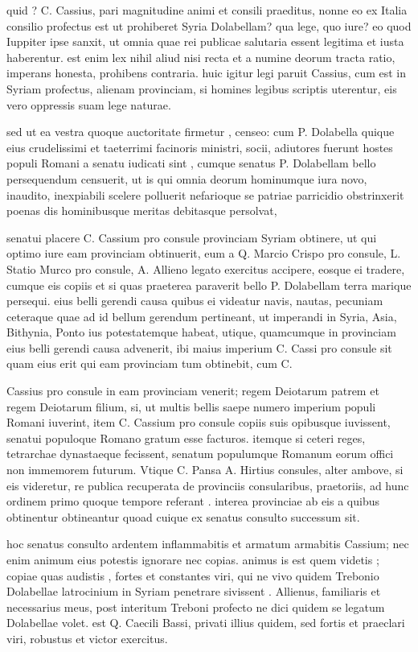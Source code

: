  quid ? C. Cassius, pari magnitudine animi et consili praeditus, nonne eo ex Italia consilio profectus est ut prohiberet Syria Dolabellam? qua lege, quo iure? eo quod Iuppiter ipse sanxit, ut omnia quae rei publicae salutaria essent legitima et iusta haberentur. est enim lex nihil aliud nisi recta et a numine deorum tracta ratio, imperans honesta, prohibens contraria. huic igitur legi paruit Cassius, cum est in Syriam profectus, alienam provinciam, si homines legibus scriptis uterentur, eis vero oppressis suam lege naturae.

 sed ut ea vestra quoque auctoritate firmetur , censeo: cum P. Dolabella quique eius crudelissimi et taeterrimi facinoris ministri, socii, adiutores fuerunt hostes populi Romani a senatu iudicati sint , cumque senatus P. Dolabellam bello persequendum censuerit, ut is qui omnia deorum hominumque iura novo, inaudito, inexpiabili scelere polluerit nefarioque se patriae parricidio obstrinxerit poenas dis hominibusque meritas debitasque persolvat,

 senatui placere C. Cassium pro consule provinciam Syriam obtinere, ut qui optimo iure eam provinciam obtinuerit, eum a Q. Marcio Crispo pro consule, L. Statio Murco pro consule, A. Allieno legato exercitus accipere, eosque ei tradere, cumque eis copiis et si quas praeterea paraverit bello P. Dolabellam terra marique persequi. eius belli gerendi causa quibus ei videatur navis, nautas, pecuniam ceteraque quae ad id bellum gerendum pertineant, ut imperandi in Syria, Asia, Bithynia, Ponto ius potestatemque habeat, utique, quamcumque in provinciam eius belli gerendi causa advenerit, ibi maius imperium C. Cassi pro consule sit quam eius erit qui eam provinciam tum obtinebit, cum C.

 Cassius pro consule in eam provinciam venerit; regem Deiotarum patrem et regem Deiotarum filium, si, ut multis bellis saepe numero imperium populi Romani iuverint, item C. Cassium pro consule copiis suis opibusque iuvissent, senatui populoque Romano gratum esse facturos. itemque si ceteri reges, tetrarchae dynastaeque fecissent, senatum populumque Romanum eorum offici non immemorem futurum. Vtique C. Pansa A. Hirtius consules, alter ambove, si eis videretur, re publica recuperata de provinciis consularibus, praetoriis, ad hunc ordinem primo quoque tempore referant . interea provinciae ab eis a quibus obtinentur obtineantur quoad cuique ex senatus consulto successum sit.

 hoc senatus consulto ardentem inflammabitis et armatum armabitis Cassium; nec enim animum eius potestis ignorare nec copias. animus is est quem videtis ; copiae quas audistis , fortes et constantes viri, qui ne vivo quidem Trebonio Dolabellae latrocinium in Syriam penetrare sivissent . Allienus, familiaris et necessarius meus, post interitum Treboni profecto ne dici quidem se legatum Dolabellae volet. est Q. Caecili Bassi, privati illius quidem, sed fortis et praeclari viri, robustus et victor exercitus.

